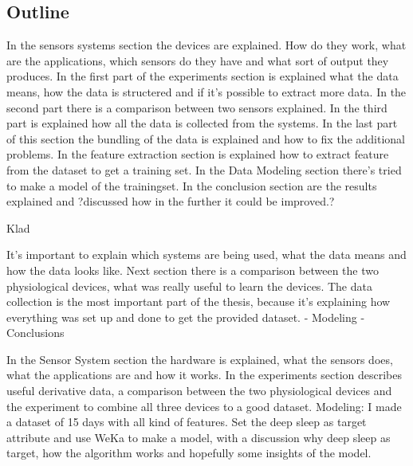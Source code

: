 	\subsection{Outline}
		In the sensors systems section the devices are explained. How do they work, what are the applications, which sensors do they have and what sort of output they produces. In the first part of the experiments section is explained what the data means, how the data is structered and if it's possible to extract more data. In the second part there is a comparison between two sensors explained. In the third part is explained how all the data is collected from the systems. In the last part of this section the bundling of the data is explained and how to fix the additional problems. In the feature extraction section is explained how to extract feature from the dataset to get a training set. In the Data Modeling section there's tried to make a model of the trainingset. In the conclusion section are the results explained and ?discussed how in the further it could be improved.?
	
		Klad		


		It's important to explain which systems are being used, what the data means and how the data looks like. Next section there is a comparison between the two physiological devices, what was really useful to learn the devices. The data collection is the most important part of the thesis, because it's explaining how everything was set up and done to get the provided dataset. - Modeling - Conclusions 

		In the Sensor System section the hardware is explained, what the sensors does, what the applications are and how it works. 
		In the experiments section describes useful derivative data, a comparison between the two physiological devices and the experiment to combine all three devices to a good dataset.
		Modeling: I made a dataset of 15 days with all kind of features. Set the deep sleep as target attribute and use WeKa to make a model, with a discussion why deep sleep as target, how the algorithm works and hopefully some insights of the model. 

